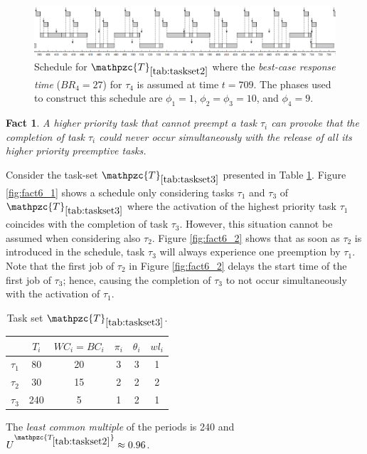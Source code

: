\documentclass[fleqn]{article}
\newtheorem{fact}{Fact}
\begin{document}
\begin{figure}[H]
	\centering
	\includegraphics[width=1.1\linewidth]{figures/fact5_2}
	\caption{Schedule for $\mathpzc{T}_{\ref{tab:taskset2}}$ where the \textit{best-case response time} ($BR_4 = 27$) for $\tau_4$ is assumed at time $t=709$. The phases used to construct this schedule are $\phi_1 = 1$, $\phi_2 = \phi_3 = 10$, and $\phi_4 = 9$.}
	\label{fig:fact5_2}
\end{figure}

\begin{fact}
	A higher priority task that cannot preempt a task $\tau_i$ can provoke that the completion of task $\tau_i$ could never occur simultaneously with the release of all its higher priority preemptive tasks.
\end{fact}

Consider the task-set $\mathpzc{T}_{\ref{tab:taskset3}}$ presented in Table \ref{tab:taskset3}. Figure \ref{fig:fact6_1} shows a schedule only considering tasks $\tau_1$ and $\tau_3$  of $\mathpzc{T}_{\ref{tab:taskset3}}$ where the activation of the highest priority task $\tau_1$ coincides with the completion of task $\tau_3$. However, this situation cannot be assumed when considering also $\tau_2$. Figure \ref{fig:fact6_2} shows that as soon as $\tau_2$ is introduced in the schedule, task $\tau_3$ will always experience one preemption by $\tau_1$. Note that the first job of $\tau_2$ in Figure \ref{fig:fact6_2} delays the start time of the first job of $\tau_3$; hence, causing the completion of $\tau_3$ to not occur simultaneously with the activation of $\tau_1$.

\begin{table}[H]
	\center
	\caption{Task set $\mathpzc{T}_{\ref{tab:taskset3}}$.}
	\label{tab:taskset3}
	\begin{tabular}{c c c c c | c}
		\hline 
		& $T_i$ & $WC_i=BC_i$ & $\pi_i$ & $\theta_i$ &  $wl_i$\\ 
		\hline 
		$\tau_1$& 80  & 20  & 3 & 3 &  1 \\ 
		$\tau_2$& 30  & 15  & 2 & 2 &  2 \\ 
		$\tau_3$& 240 & 5   & 1 & 2 &  1 \\ 
		\hline 
	\end{tabular}
	\small
	\item The \textit{least common multiple} of the periods is 240 and $U^{\mathpzc{T_{\ref{tab:taskset2}}}} \approx 0.96$.
\end{table} 
\end{document}
